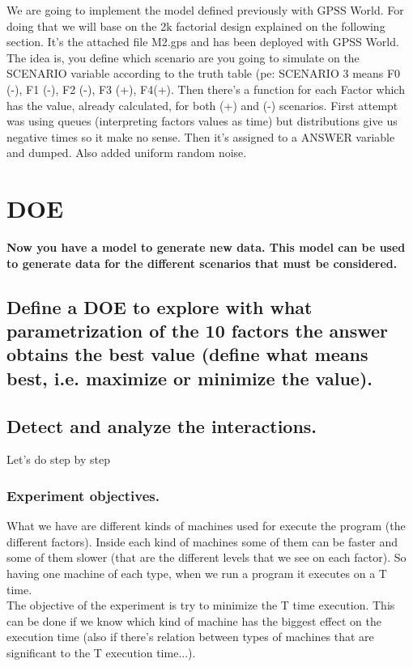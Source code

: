 \documentclass[12pt]{article}
\begin{document}
\hfill%
\begin{minipage}{0.6\textwidth}\raggedright
We are going to implement the model defined previously with GPSS World. For doing that we will base on the 2k factorial design explained on the following section. It's the attached file M2.gps and has been deployed with GPSS World.\\
The idea is, you define which scenario are you going to simulate on the SCENARIO variable according to the truth table (pe: SCENARIO 3 means F0 (-), F1 (-), F2 (-), F3 (+), F4(+). Then there's a function for each Factor which has the value, already calculated, for both (+) and (-) scenarios. First attempt was using queues (interpreting factors values as time) but distributions give us negative times so it make no sense. Then it's assigned to a ANSWER variable and dumped. Also added uniform random noise.\\
\end{minipage}


\section {DOE}
\vspace{5mm}
\textbf{Now you have a model to generate new data. This model can be used to generate data for the different scenarios that must be considered.}
\subsection {Define a DOE to explore with what parametrization of the 10 factors the answer obtains the best value (define what means best, i.e. maximize or minimize the value).}
\subsection {Detect and analyze the interactions.}
Let's do step by step

\subsubsection{Experiment objectives.}
What we have are different kinds of machines used for execute the program (the different factors). Inside each kind of machines some of them can be faster and some of them slower (that are the different levels that we see on each factor). So having one machine of each type, when we run a program it executes on a T time.\\
The objective of the experiment is try to minimize the T time execution. This can be done if we know which kind of machine has the biggest effect on the execution time (also if there's relation between types of machines that are significant to the T execution time...).
\end{document}
